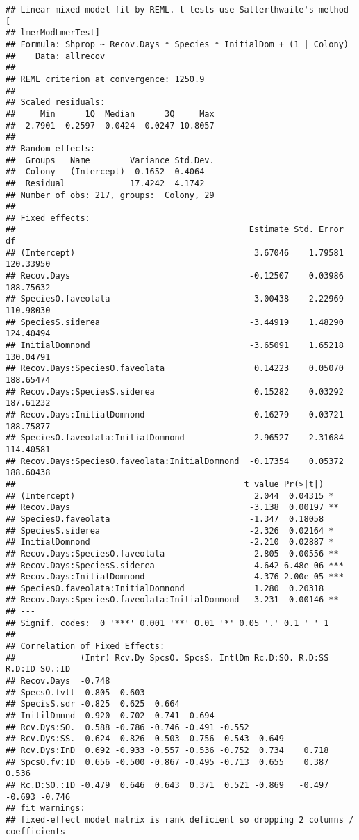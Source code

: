 \documentclass[]{article}
\begin{document}
\begin{verbatim}
## Linear mixed model fit by REML. t-tests use Satterthwaite's method [
## lmerModLmerTest]
## Formula: Shprop ~ Recov.Days * Species * InitialDom + (1 | Colony)
##    Data: allrecov
## 
## REML criterion at convergence: 1250.9
## 
## Scaled residuals: 
##     Min      1Q  Median      3Q     Max 
## -2.7901 -0.2597 -0.0424  0.0247 10.8057 
## 
## Random effects:
##  Groups   Name        Variance Std.Dev.
##  Colony   (Intercept)  0.1652  0.4064  
##  Residual             17.4242  4.1742  
## Number of obs: 217, groups:  Colony, 29
## 
## Fixed effects:
##                                               Estimate Std. Error        df
## (Intercept)                                    3.67046    1.79581 120.33950
## Recov.Days                                    -0.12507    0.03986 188.75632
## SpeciesO.faveolata                            -3.00438    2.22969 110.98030
## SpeciesS.siderea                              -3.44919    1.48290 124.40494
## InitialDomnond                                -3.65091    1.65218 130.04791
## Recov.Days:SpeciesO.faveolata                  0.14223    0.05070 188.65474
## Recov.Days:SpeciesS.siderea                    0.15282    0.03292 187.61232
## Recov.Days:InitialDomnond                      0.16279    0.03721 188.75877
## SpeciesO.faveolata:InitialDomnond              2.96527    2.31684 114.40581
## Recov.Days:SpeciesO.faveolata:InitialDomnond  -0.17354    0.05372 188.60438
##                                              t value Pr(>|t|)    
## (Intercept)                                    2.044  0.04315 *  
## Recov.Days                                    -3.138  0.00197 ** 
## SpeciesO.faveolata                            -1.347  0.18058    
## SpeciesS.siderea                              -2.326  0.02164 *  
## InitialDomnond                                -2.210  0.02887 *  
## Recov.Days:SpeciesO.faveolata                  2.805  0.00556 ** 
## Recov.Days:SpeciesS.siderea                    4.642 6.48e-06 ***
## Recov.Days:InitialDomnond                      4.376 2.00e-05 ***
## SpeciesO.faveolata:InitialDomnond              1.280  0.20318    
## Recov.Days:SpeciesO.faveolata:InitialDomnond  -3.231  0.00146 ** 
## ---
## Signif. codes:  0 '***' 0.001 '**' 0.01 '*' 0.05 '.' 0.1 ' ' 1
## 
## Correlation of Fixed Effects:
##             (Intr) Rcv.Dy SpcsO. SpcsS. IntlDm Rc.D:SO. R.D:SS R.D:ID SO.:ID
## Recov.Days  -0.748                                                          
## SpecsO.fvlt -0.805  0.603                                                   
## SpecisS.sdr -0.825  0.625  0.664                                            
## InitilDmnnd -0.920  0.702  0.741  0.694                                     
## Rcv.Dys:SO.  0.588 -0.786 -0.746 -0.491 -0.552                              
## Rcv.Dys:SS.  0.624 -0.826 -0.503 -0.756 -0.543  0.649                       
## Rcv.Dys:InD  0.692 -0.933 -0.557 -0.536 -0.752  0.734    0.718              
## SpcsO.fv:ID  0.656 -0.500 -0.867 -0.495 -0.713  0.655    0.387  0.536       
## Rc.D:SO.:ID -0.479  0.646  0.643  0.371  0.521 -0.869   -0.497 -0.693 -0.746
## fit warnings:
## fixed-effect model matrix is rank deficient so dropping 2 columns / coefficients
\end{verbatim}
\end{document}
